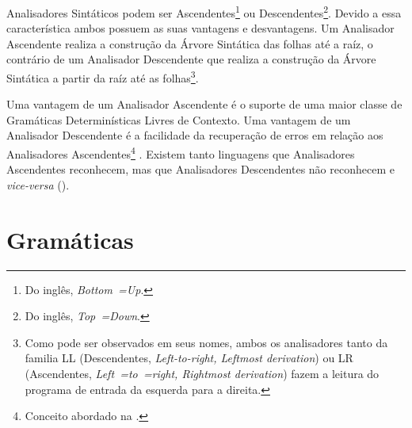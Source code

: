 Analisadores Sintáticos podem ser Ascendentes\footnote{
Do inglês, \textit{Bottom~=Up}.
}
ou Descendentes\footnote{
Do inglês, \textit{Top~=Down}.
}.
Devido a essa característica ambos possuem as suas vantagens e
desvantagens.
Um Analisador Ascendente realiza a construção da Árvore Sintática das folhas até a raíz,
o contrário de um Analisador Descendente que realiza a construção da Árvore Sintática a partir da raíz até as folhas\footnote{
Como pode ser observados em seus nomes,
ambos os analisadores tanto da familia LL (Descendentes,
\textit{Left-to-right, Leftmost derivation}) ou LR (Ascendentes, \textit{Left~=to~=right,
Rightmost derivation}) fazem a leitura do programa de entrada da esquerda para a direita.
}.

Uma vantagem de um Analisador Ascendente é o suporte de uma maior classe de Gramáticas Determinísticas Livres de Contexto.
Uma vantagem de um Analisador Descendente é a facilidade da recuperação de erros em relação aos Analisadores Ascendentes\footnote{
Conceito abordado na
.
}
\cite{sippu1982,lr1ErrorRecovery,errorRecoveryForYaccParsers,repairingSyntaxErrorsInLR,larkJosefGrosch,errorsInLRParsers}.
Existem tanto linguagens que Analisadores Ascendentes reconhecem,
mas que Analisadores Descendentes não reconhecem e
\textit{vice-versa} ().


\section{Gramáticas}
\label{section:introducaoGramaticas}

